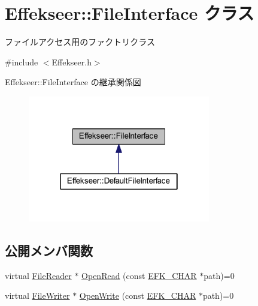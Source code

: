 \hypertarget{class_effekseer_1_1_file_interface}{}\section{Effekseer\+:\+:File\+Interface クラス}
\label{class_effekseer_1_1_file_interface}


ファイルアクセス用のファクトリクラス  




{\ttfamily \#include $<$Effekseer.\+h$>$}



Effekseer\+:\+:File\+Interface の継承関係図\nopagebreak
\begin{figure}[H]
\begin{center}
\leavevmode
\includegraphics[width=226pt]{class_effekseer_1_1_file_interface__inherit__graph}
\end{center}
\end{figure}
\subsection*{公開メンバ関数}
\begin{DoxyCompactItemize}
\item 
virtual \mbox{\hyperlink{class_effekseer_1_1_file_reader}{File\+Reader}} $\ast$ \mbox{\hyperlink{class_effekseer_1_1_file_interface_ad8744ad57226d9a2ce74f6ef6e2f9a41}{Open\+Read}} (const \mbox{\hyperlink{_effekseer_8h_a50b026abea014b47854bcd835b3b6233}{E\+F\+K\+\_\+\+C\+H\+AR}} $\ast$path)=0
\item 
virtual \mbox{\hyperlink{class_effekseer_1_1_file_writer}{File\+Writer}} $\ast$ \mbox{\hyperlink{class_effekseer_1_1_file_interface_a1e60cb81a5cae39b37e44570ef693d91}{Open\+Write}} (const \mbox{\hyperlink{_effekseer_8h_a50b026abea014b47854bcd835b3b6233}{E\+F\+K\+\_\+\+C\+H\+AR}} $\ast$path)=0
\end{DoxyCompactItemize}


